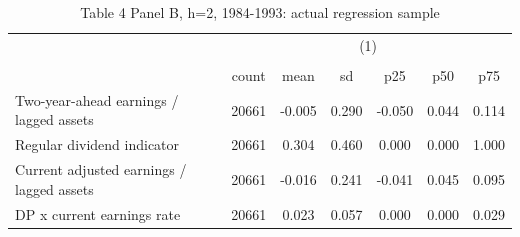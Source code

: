 \begin{table}[htbp]\centering
\def\sym#1{\ifmmode^{#1}\else\(^{#1}\)\fi}
\caption{Table 4 Panel B, h=2, 1984-1993: actual regression sample}
\begin{tabular}{l*{1}{cccccc}}
\hline\hline
                    &\multicolumn{6}{c}{(1)}                                                      \\
                    &\multicolumn{6}{c}{}                                                         \\
                    &       count&        mean&          sd&         p25&         p50&         p75\\
\hline
Two-year-ahead earnings / lagged assets&       20661&      -0.005&       0.290&      -0.050&       0.044&       0.114\\
Regular dividend indicator&       20661&       0.304&       0.460&       0.000&       0.000&       1.000\\
Current adjusted earnings / lagged assets&       20661&      -0.016&       0.241&      -0.041&       0.045&       0.095\\
DP x current earnings rate&       20661&       0.023&       0.057&       0.000&       0.000&       0.029\\
\hline\hline
\end{tabular}
\end{table}
